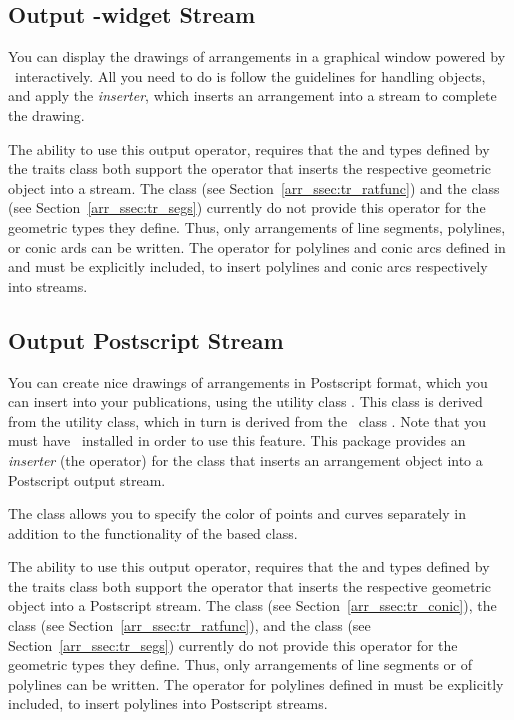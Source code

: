 \subsection{Output \qt{}-widget Stream}\label{arr_ssec:qt_stream}
You can display the drawings of arrangements in a graphical window
powered by \qt\ interactively. All you need to do is follow the
guidelines for handling  objects, and apply the
{\em inserter}, which inserts an arrangement into a 
stream to complete the drawing.

The ability to use this output operator, requires that the
 and  types defined by the
traits class both support the \ccc{<<} operator that inserts the
respective geometric object into a  stream. The
 class (see
Section~\ref{arr_ssec:tr_ratfunc}) and the 
class (see Section~\ref{arr_ssec:tr_segs}) currently do not provide
this operator for the geometric types they define. Thus, only
arrangements of line segments, polylines, or conic ards can be written.
The \ccc{<<} operator for polylines and conic arcs defined in
 and
must be explicitly included, to insert polylines and conic arcs
respectively into  streams.

\subsection{Output Postscript Stream\label{arr_ssec:ps_stream}}
You can create nice drawings of arrangements in Postscript format, which
you can insert into your publications, using the utility class 
. This class is derived from the 
 utility class, which in turn is derived from
the \leda\ class . Note that you must have \leda\ installed
in order to use this feature. 
This package provides an {\em inserter} (the \ccc{<<} operator) for
the  class that inserts an arrangement
object into a Postscript output stream.

The 
class allows you to specify the color of points and curves separately
in addition to the functionality of the based class. 

The ability to use this output operator, requires that the
 and  types defined by the
traits class both support the \ccc{<<} operator that inserts the
respective geometric object into a Postscript stream. The
 class (see Section~\ref{arr_ssec:tr_conic}), the
 class (see Section~\ref{arr_ssec:tr_ratfunc}),
and the  class (see Section~\ref{arr_ssec:tr_segs})
currently do not provide this operator for the geometric types they define.
Thus, only arrangements of line segments or of polylines can be written.
The \ccc{<<} operator for polylines defined in
 must be explicitly
included, to insert polylines into Postscript streams.
